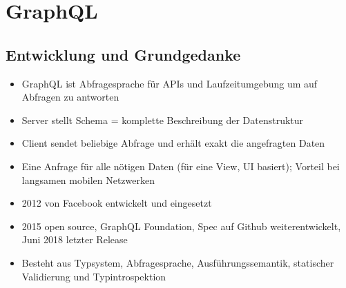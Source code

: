 \section{GraphQL}

\subsection{Entwicklung und Grundgedanke}
\begin{itemize}
  \item GraphQL ist Abfragesprache für APIs und Laufzeitumgebung um auf Abfragen zu antworten
  \item Server stellt Schema = komplette Beschreibung der Datenstruktur
  \item Client sendet beliebige Abfrage und erhält exakt die angefragten Daten
  \item Eine Anfrage für alle nötigen Daten (für eine View, UI basiert); Vorteil bei langsamen mobilen Netzwerken
  \item 2012 von Facebook entwickelt und eingesetzt
  \item 2015 open source, GraphQL Foundation, Spec auf Github weiterentwickelt, Juni 2018 letzter Release
  \item Besteht aus Typsystem, Abfragesprache, Ausführungssemantik, statischer Validierung und Typintrospektion
\end{itemize}

